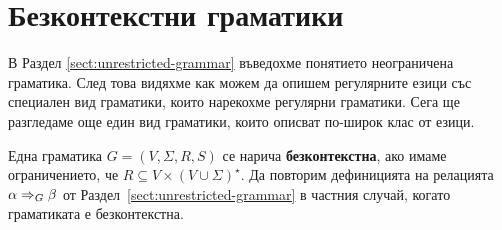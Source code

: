 \section{Безконтекстни граматики}\label{sect:context-free:derive}

В Раздел \ref{sect:unrestricted-grammar} въведохме понятието неограничена граматика. След това видяхме как можем да опишем регулярните езици
със специален вид граматики, които нарекохме регулярни граматики.
Сега ще разгледаме още един вид граматики, които описват по-широк клас от езици.

Една граматика $G = (V, \Sigma, R, S)$ се нарича {\bf безконтекстна}, ако 
имаме ограничението, че $R \subseteq V\times (V\cup\Sigma)^\star$.
Да повторим дефиницията на релацията $\alpha \derive{}_G \beta$ от Раздел~\ref{sect:unrestricted-grammar} в частния случай, когато граматиката е безконтекстна.

\begin{important}
  \begin{prooftree}
  \end{prooftree}
\end{important}





